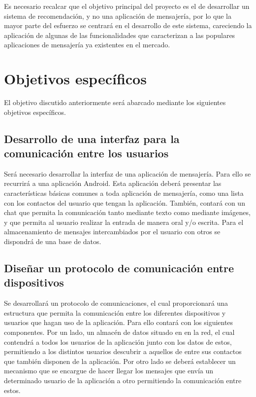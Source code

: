Es necesario recalcar que el objetivo principal del proyecto es el de desarrollar un sistema de recomendación, y no una aplicación de mensajería, por lo que la mayor parte del esfuerzo se centrará en el desarrollo de este sistema, careciendo la aplicación de algunas de las funcionalidades que caracterizan a las populares aplicaciones de mensajería ya existentes en el mercado.


\section{Objetivos específicos}

El objetivo discutido anteriormente será abarcado mediante los siguientes objetivos específicos.

\subsection{Desarrollo de una interfaz para la comunicación entre los usuarios}
Será necesario desarrollar la interfaz de una aplicación de mensajería. Para ello se recurrirá a una aplicación Android. Esta aplicación deberá presentar las características básicas comunes a toda aplicación de mensajería, como una lista con los contactos del usuario que tengan la aplicación. También, contará con un chat que permita la comunicación tanto mediante texto como mediante imágenes, y que permita al usuario realizar la entrada de manera oral y/o escrita. Para el almacenamiento de mensajes intercambiados por el usuario con otros se dispondrá de una base de datos.

\subsection{Diseñar un protocolo de comunicación entre dispositivos}
Se desarrollará un protocolo de comunicaciones, el cual proporcionará una estructura que permita la comunicación entre los diferentes dispositivos y usuarios que hagan uso de la aplicación. Para ello contará con los siguientes componentes. Por un lado, un almacén de datos situado en en la red, el cual contendrá a todos los usuarios de la aplicación junto con los datos de estos, permitiendo a los distintos usuarios descubrir a aquellos de entre sus contactos que también disponen de la aplicación. Por otro lado se deberá establecer un mecanismo que se encargue de hacer llegar los mensajes que envía un determinado usuario de la aplicación a otro permitiendo la comunicación entre estos.  

